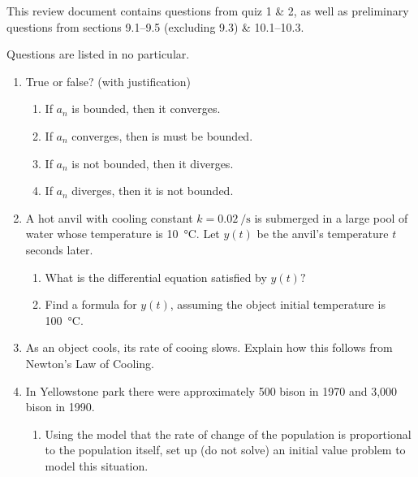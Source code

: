 \documentclass{nosvagor-notes}
\begin{document}
This review document contains questions from quiz 1 \& 2, as well as
preliminary questions from sections 9.1--9.5 (excluding 9.3) \& 10.1--10.3.

Questions are listed in no particular.

\begin{enumerate}
  \item True or false? (with justification)
  \begin{enumerate}
    \item If \({a_n}\) is bounded, then it converges.
      \vspace{130pt}
    \item If \({a_n}\) converges, then is must be bounded.
      \vspace{130pt}
    \item If \({a_n}\) is not bounded, then it diverges.
      \vspace{130pt}
    \item If \({a_n}\) diverges, then it is not bounded.
      \vspace{130pt}
  \end{enumerate}

  \newpage

 \item A hot anvil with cooling constant \(k = \SI{0.02}{\per\second}\) is
   submerged in a large pool of water whose temperature is \SI{10}{\celsius}.
   Let \(y(t)\) be the anvil’s temperature \(t\) seconds later.
   \begin{enumerate}
     \item What is the differential equation satisfied by \(y(t)?\)
       \vspace{140pt}

     \item Find a formula for \(y(t)\), assuming the object initial temperature
       is \SI{100}{\celsius}.
       \vspace{180pt}
   \end{enumerate}

  \item As an object cools, its rate of cooing slows. Explain how this follows
    from Newton's Law of Cooling.

    \newpage

  \item In Yellowstone park there were approximately 500 bison in 1970 and
    3,000 bison in 1990.
    \begin{enumerate}
      \item Using the model that the rate of change of the population is
        proportional to the population itself, set up (do not solve) an initial
        value problem to model this situation.
        \vspace{140pt}


\end{enumerate}
\end{enumerate}
\end{document}
